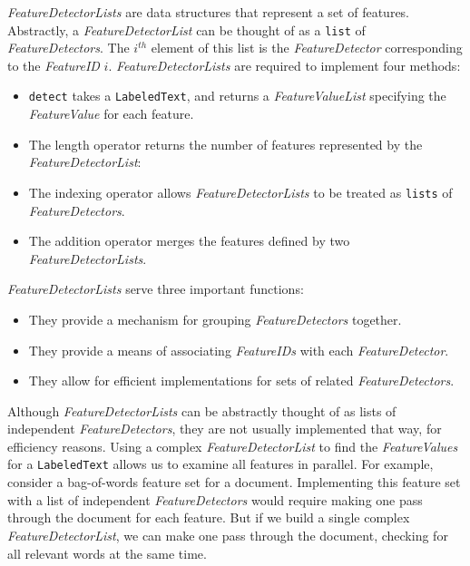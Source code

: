 \documentclass[12pt]{article}
\begin{document}
      \textit{FeatureDetectorLists} are data structures that represent
      a set of features.  Abstractly, a \textit{FeatureDetectorList}
      can be thought of as a \texttt{list} of
      \textit{FeatureDetectors}.  The $i^{th}$ element of this list is
      the \textit{FeatureDetector} corresponding to the
      \textit{FeatureID} $i$.  \textit{FeatureDetectorLists} are
      required to implement four methods:

      \begin{itemize}

        \item \texttt{detect} takes a \texttt{LabeledText},
        and returns a \textit{FeatureValueList} specifying the
        \textit{FeatureValue} for each feature.

        \item The length operator returns the number of features
        represented by the \textit{FeatureDetectorList}:

        \item The indexing operator allows
        \textit{FeatureDetectorLists} to be treated as \texttt{lists}
        of \textit{FeatureDetectors}.

        \item The addition operator merges the features defined by two
        \textit{FeatureDetectorLists}.

      \end{itemize}

      \noindent \textit{FeatureDetectorLists} serve three important
      functions:

      \begin{itemize}
        \item They provide a mechanism for grouping
        \textit{FeatureDetectors} together.

        \item They provide a means of associating \textit{FeatureIDs}
        with each \textit{FeatureDetector}.

        \item They allow for efficient implementations for sets of
        related \textit{FeatureDetectors}.
      \end{itemize}

      Although \textit{FeatureDetectorLists} can be abstractly thought
      of as lists of independent \textit{FeatureDetectors}, they are
      not usually implemented that way, for efficiency reasons.  Using
      a complex \textit{FeatureDetectorList} to find the
      \textit{FeatureValues} for a \texttt{LabeledText} allows us to
      examine all features in parallel.  For example, consider a
      bag-of-words feature set for a document.  Implementing this
      feature set with a list of independent \textit{FeatureDetectors}
      would require making one pass through the document for each
      feature.  But if we build a single complex
      \textit{FeatureDetectorList}, we can make one pass through the
      document, checking for all relevant words at the same time.
\end{document}
